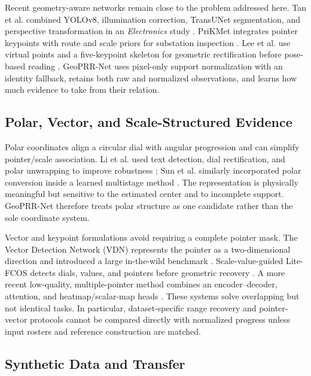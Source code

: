 \documentclass[electronics,article,submit,oneauthor]{Definitions/mdpi}
\newcommand{\modelname}{GeoPRR-Net\xspace}
\begin{document}
Recent geometry-aware networks remain close to the problem addressed here. Tan et al. combined YOLOv8, illumination correction, TransUNet segmentation, and perspective transformation in an \emph{Electronics} study \cite{tan2024transunet}. PriKMet integrates pointer keypoints with route and scale priors for substation inspection \cite{chu2025prikmet}. Lee et al. use virtual points and a five-keypoint skeleton for geometric rectification before pose-based reading \cite{lee2026p2yolo}. \modelname uses pixel-only support normalization with an identity fallback, retains both raw and normalized observations, and learns how much evidence to take from their relation.

\subsection{Polar, Vector, and Scale-Structured Evidence}

Polar coordinates align a circular dial with angular progression and can simplify pointer/scale association. Li et al. used text detection, dial rectification, and polar unwrapping to improve robustness \cite{li2020text}; Sun et al. similarly incorporated polar conversion inside a learned multistage method \cite{sun2023pointer}. The representation is physically meaningful but sensitive to the estimated center and to incomplete support. \modelname therefore treats polar structure as one candidate rather than the sole coordinate system.

Vector and keypoint formulations avoid requiring a complete pointer mask. The Vector Detection Network (VDN) represents the pointer as a two-dimensional direction and introduced a large in-the-wild benchmark \cite{dong2021vdn}. Scale-value-guided Lite-FCOS detects dials, values, and pointers before geometric recovery \cite{wang2023litefcos}. A more recent low-quality, multiple-pointer method combines an encoder--decoder, attention, and heatmap/scalar-map heads \cite{feng2025wild}. These systems solve overlapping but not identical tasks. In particular, dataset-specific range recovery and pointer-vector protocols cannot be compared directly with normalized progress unless input rosters and reference construction are matched.

\subsection{Synthetic Data and Transfer}
\end{document}
